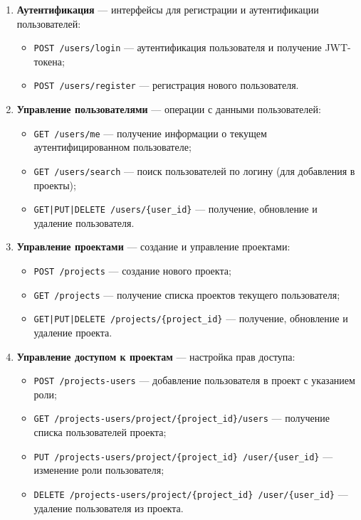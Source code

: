 \begin{enumerate}[wide=12.5mm, leftmargin=12.5mm]
    \item \textbf{Аутентификация} — интерфейсы для регистрации и аутентификации пользователей:
    \begin{itemize}[wide=12.5mm, leftmargin=12.5mm]
        \item \texttt{POST /users/login} — аутентификация пользователя и получение JWT-токена;
        \item \texttt{POST /users/register} — регистрация нового пользователя.
    \end{itemize}

    \item \textbf{Управление пользователями} — операции с данными пользователей:
    \begin{itemize}[wide=12.5mm, leftmargin=12.5mm]
        \item \texttt{GET /users/me} — получение информации о текущем аутентифицированном пользователе;
        \item \texttt{GET /users/search} — поиск пользователей по логину (для добавления в проекты);
        \item \texttt{GET|PUT|DELETE /users/\{user\_id\}} — получение, обновление и удаление пользователя.
    \end{itemize}

    \item \textbf{Управление проектами} — создание и управление проектами:
    \begin{itemize}[wide=12.5mm, leftmargin=12.5mm]
        \item \texttt{POST /projects} — создание нового проекта;
        \item \texttt{GET /projects} — получение списка проектов текущего пользователя;
        \item \texttt{GET|PUT|DELETE /projects/\{project\_id\}} — получение, обновление и удаление проекта.
    \end{itemize}

    \item \textbf{Управление доступом к проектам} — настройка прав доступа:
    \begin{itemize}[wide=12.5mm, leftmargin=12.5mm]
        \item \texttt{POST /projects-users} — добавление пользователя в проект с указанием роли;
        \item \texttt{GET /projects-users/project/\{project\_id\}/users} — получение списка пользователей проекта;
        \item \texttt{PUT /projects-users/project/\{project\_id\} /user/\{user\_id\}} — изменение роли пользователя;
        \item \texttt{DELETE /projects-users/project/\{project\_id\} /user/\{user\_id\}} — удаление пользователя из проекта.
    \end{itemize}


\end{enumerate}
